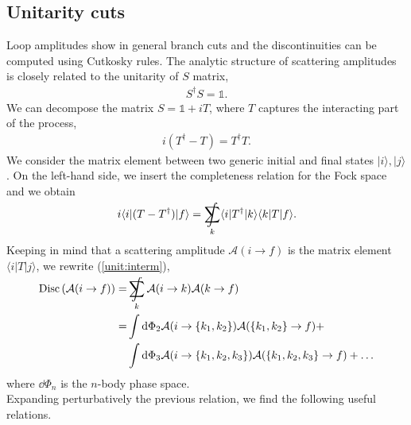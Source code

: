 \subsection{Unitarity cuts}
Loop amplitudes show in general branch cuts and the discontinuities can be computed using Cutkosky rules. The analytic structure of scattering amplitudes is closely related to the unitarity of $S$ matrix, 
\begin{align*}
	S^\dagger S=\mathbb{1}.
\end{align*}
We can decompose the matrix $S=\mathbb{1}+iT$, where $T$ captures the interacting part of the process,
\begin{align*}
	i(T^\dagger-T)=T^\dagger T.
\end{align*}
We consider the matrix element between two generic initial and final states $|i\rangle, |j\rangle$. On the left-hand side, we insert the completeness relation for the Fock space and we obtain
\begin{align}
	i\langle i|(T-T^\dagger)|f\rangle=\SumInt_k \langle i|T^\dagger|k\rangle\langle k|T|f\rangle.	\label{unit:interm}
\end{align}
Keeping in mind that a scattering amplitude $\mathcal{A}(i\rightarrow f)$ is the matrix element $\langle i |T| j \rangle$, we rewrite (\ref{unit:interm}),
\begin{align*}
	\text{Disc}\left(\mathcal{A}(i\rightarrow f)\right)=&\SumInt_k \mathcal{A}(i\rightarrow k) \mathcal{A}(k\rightarrow f)\\
	=&\int \dd \Phi_2 \mathcal{A}(i\rightarrow \{k_1,k_2\}) \mathcal{A}(\{k_1,k_2\}\rightarrow f)+\\
	&\int \dd \Phi_3 \mathcal{A}(i\rightarrow \{k_1,k_2,k_3\}) \mathcal{A}(\{k_1,k_2,k_3\}\rightarrow f)+\dots
\end{align*}
where $\dd\Phi_n$ is the $n$-body phase space.\\
Expanding perturbatively the previous relation, we find the following useful relations.
